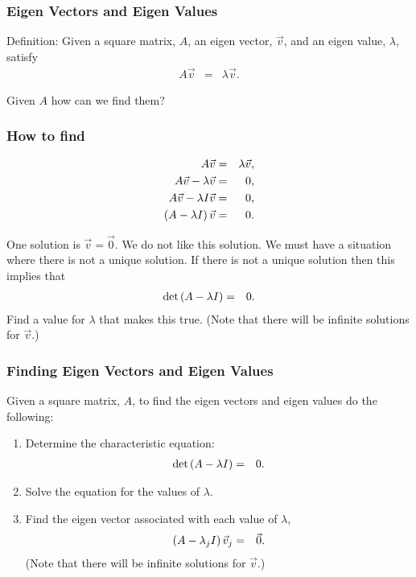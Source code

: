 \begin{frame}
  \frametitle{Eigen Vectors and Eigen Values}

  Definition: Given a square matrix, $A$, an eigen vector, $\vec{v}$, and an
  eigen value, $\lambda$, satisfy
  \begin{eqnarray*}
    A \vec{v} & = & \lambda \vec{v}.
  \end{eqnarray*}

  Given $A$ how can we find them?

\end{frame}


\begin{frame}
  \frametitle{How to find}

  \begin{eqnarray*}
    A \vec{v} & = & \lambda \vec{v}, \\
    A \vec{v} - \lambda \vec{v} & = & 0, \\
    A \vec{v} - \lambda I \vec{v} & = & 0, \\
    \left( A - \lambda I \right) \vec{v} & = & 0.
  \end{eqnarray*}

  One solution is $\vec{v}=\vec{0}$. We do not like this solution. We
  must have a situation where there is not a unique solution. If there
  is not a unique solution then this implies that
  \begin{eqnarray*}
    \det\left( A - \lambda I \right) & = & 0.
  \end{eqnarray*}
  Find a value for $\lambda$ that makes this true. (Note that there
  will be infinite solutions for $\vec{v}$.)

\end{frame}


\begin{frame}
  \frametitle{Finding Eigen Vectors and Eigen Values}

  Given a square matrix, $A$, to find the eigen vectors and eigen
  values do the following:
  \begin{enumerate}
  \item Determine the characteristic equation:
    \begin{eqnarray*}
      \det\left( A - \lambda I \right) & = & 0.
    \end{eqnarray*}
  \item Solve the equation for the values of $\lambda$.
  \item Find the eigen vector associated with each value of $\lambda$,
    \begin{eqnarray*}
      \left( A - \lambda_j I \right) \vec{v}_j & = & \vec{0}.
    \end{eqnarray*}
    (Note that there will be infinite solutions for $\vec{v}$.)
  \end{enumerate}

\end{frame}

